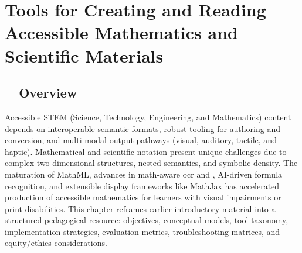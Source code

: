 \chapter{Tools for Creating and Reading Accessible Mathematics and Scientific Materials}\label{ch11:chap:accessible-math}

\section{~~Overview}\label{ch11:sec:overview}
Accessible STEM (Science, Technology, Engineering, and Mathematics) content depends on interoperable semantic formats, robust tooling for authoring and conversion, and multi-modal output pathways (visual, auditory, tactile, and haptic). Mathematical and scientific notation present unique  challenges due to complex two‑dimensional structures, nested semantics, and symbolic density. The maturation of \gls{MathML}\supercite{W3CMathML, W3CMathML3, W3CMathML4, W3CMathMLWeb}, advances in math-aware \gls{ocr} and \supercite{AdobeOCR, DeepLearningOCROverview}, AI-driven formula recognition\supercite{ArxivMER2203, ArxivMER2303}, and extensible display frameworks like MathJax\supercite{MathJax, MathJaxDocs} has accelerated production of accessible mathematics for learners with visual impairments or print disabilities. This chapter reframes earlier introductory material into a structured pedagogical resource: objectives, conceptual models, tool taxonomy, implementation strategies, evaluation metrics, troubleshooting matrices, and equity/ethics considerations.


